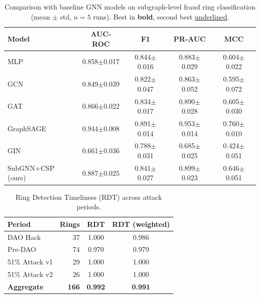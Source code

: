 \begin{table}[t]
\centering
\caption{Comparison with baseline GNN models on subgraph-level fraud ring classification (mean $\pm$ std, $n=5$ runs). Best in \textbf{bold}, second best \underline{underlined}.}
\label{tab:baselines}
\begin{tabular}{lcccc}
\toprule
\textbf{Model} & \textbf{AUC-ROC} & \textbf{F1} & \textbf{PR-AUC} & \textbf{MCC} \\
\midrule
MLP                  & 0.858$\pm$0.017 & 0.844$\pm$0.016 & 0.883$\pm$0.029 & 0.604$\pm$0.022 \\
GCN                  & 0.849$\pm$0.039 & 0.822$\pm$0.047 & 0.863$\pm$0.052 & 0.595$\pm$0.072 \\
GAT                  & 0.866$\pm$0.022 & 0.834$\pm$0.017 & 0.890$\pm$0.028 & 0.605$\pm$0.030 \\
GraphSAGE            & 0.944$\pm$0.008 & 0.891$\pm$0.014 & 0.953$\pm$0.014 & 0.760$\pm$0.010 \\
GIN                  & 0.661$\pm$0.036 & 0.788$\pm$0.031 & 0.685$\pm$0.025 & 0.424$\pm$0.051 \\
\midrule
SubGNN+CSP (ours)    & 0.887$\pm$0.025 & 0.841$\pm$0.027 & 0.899$\pm$0.023 & 0.646$\pm$0.051 \\
\bottomrule
\end{tabular}
\end{table}

\begin{table}[t]
\centering
\caption{Ring Detection Timeliness (RDT) across attack periods.}
\label{tab:rdt}
\begin{tabular}{lrcc}
\toprule
\textbf{Period} & \textbf{Rings} & \textbf{RDT} & \textbf{RDT (weighted)} \\
\midrule
DAO Hack             & 37  & 1.000 & 0.986 \\
Pre-DAO              & 74  & 0.970 & 0.979 \\
51\% Attack v1       & 29  & 1.000 & 1.000 \\
51\% Attack v2       & 26  & 1.000 & 1.000 \\
\midrule
\textbf{Aggregate} & \textbf{166} & \textbf{0.992} & \textbf{0.991} \\
\bottomrule
\end{tabular}
\end{table}

